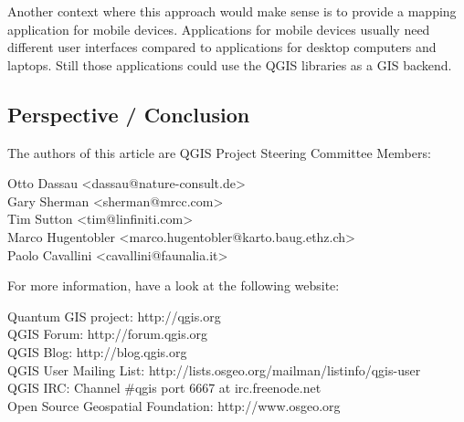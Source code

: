 Another context where this approach would make sense is to provide a mapping application for mobile devices. Applications for mobile devices usually need different user interfaces compared to applications for desktop computers and laptops. Still those applications could use the QGIS libraries as a GIS backend.

\subsection{Perspective / Conclusion}


The authors of this article are QGIS Project Steering Committee Members:

Otto Dassau <dassau@nature-consult.de>  
\\Gary Sherman <sherman@mrcc.com>
\\Tim Sutton <tim@linfiniti.com>
\\Marco Hugentobler <marco.hugentobler@karto.baug.ethz.ch>
\\Paolo Cavallini <cavallini@faunalia.it>


For more information, have a look at the following website:

Quantum GIS project: http://qgis.org
\\QGIS Forum: http://forum.qgis.org
\\QGIS Blog: http://blog.qgis.org
\\QGIS User Mailing List: http://lists.osgeo.org/mailman/listinfo/qgis-user
\\QGIS IRC: Channel \#qgis port 6667 at irc.freenode.net
\\Open Source Geospatial Foundation: http://www.osgeo.org
 


 




